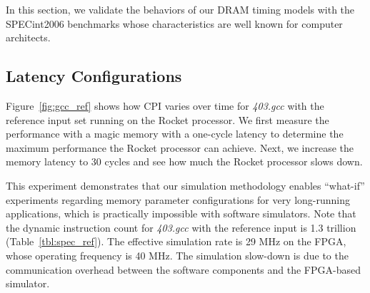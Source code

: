 In this section, we validate the behaviors of our DRAM timing models with
the SPECint2006 benchmarks whose characteristics are well known for computer architects.

\subsection{Latency Configurations}



Figure~\ref{fig:gcc_ref} shows how CPI varies over time for \textit{403.gcc} with the reference
input set running on the Rocket processor. We first measure the performance with a
magic memory with a one-cycle latency to determine the maximum performance the Rocket processor can
achieve. Next, we increase the memory latency to 30 cycles and see how much the Rocket processor
slows down.

This experiment demonstrates that our simulation methodology enables ``what-if'' experiments
regarding memory parameter configurations for very long-running applications, which is
practically impossible with software simulators. Note that the dynamic instruction count for
\textit{403.gcc} with the reference input is 1.3 trillion (Table~\ref{tbl:spec_ref}). The
effective simulation rate is 29 MHz on the FPGA, whose operating frequency is 40 MHz. The
simulation slow-down is due to the communication overhead between the software components and the
FPGA-based simulator.

